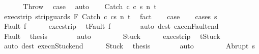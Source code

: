 \begin{isabellebody}
\isanewline
\ \ \isamarkupfalse%
\isanewline
{}\isamarkupfalse%
\isanewline
\ \ \isamarkupfalse%
\ Throw\ \isamarkupfalse%
\ {\isacharquery}case\ \isamarkupfalse%
\ auto\isanewline
{}\isamarkupfalse%
\isanewline
\ \ \isamarkupfalse%
\ {\isacharparenleft}Catch\ c{}\ c{}\ s\ n\ t{\isacharparenright}\isanewline
\ \ \isamarkupfalse%
\ exec{\isacharunderscore}strip{\isacharcolon}\ {\isachardoublequoteopen}{\isasymGamma}{\isasymturnstile}{\isasymlangle}strip{\isacharunderscore}guards\ F\ {\isacharparenleft}Catch\ c{}\ c{}{\isacharparenright}{\isacharcomma}s{\isasymrangle}\ {\isacharequal}n{\isasymRightarrow}\ t{\isachardoublequoteclose}\ \isamarkupfalse%
\ fact\isanewline
\ \ \isamarkupfalse%
\ {\isacharquery}case\isanewline
\ \ \isamarkupfalse%
\ {\isacharparenleft}cases\ {\isachardoublequoteopen}s{\isachardoublequoteclose}{\isacharparenright}\isanewline
\ \ \ \ \isamarkupfalse%
\ {\isacharparenleft}Fault\ f{\isacharparenright}\isanewline
\ \ \ \ \isamarkupfalse%
\ exec{\isacharunderscore}strip\ \isamarkupfalse%
\ {\isachardoublequoteopen}t{\isacharequal}Fault\ f{\isachardoublequoteclose}\isanewline
\ \ \ \ \ \ \isamarkupfalse%
\ {\isacharparenleft}auto\ dest{\isacharcolon}\ execn{\isacharunderscore}Fault{\isacharunderscore}end{\isacharparenright}\isanewline
\ \ \ \ \isamarkupfalse%
\ Fault\ \isamarkupfalse%
\ {\isacharquery}thesis\isanewline
\ \ \ \ \ \ \isamarkupfalse%
\ auto\isanewline
\ \ \isamarkupfalse%
\isanewline
\ \ \ \ \isamarkupfalse%
\ Stuck\isanewline
\ \ \ \ \isamarkupfalse%
\ exec{\isacharunderscore}strip\ \isamarkupfalse%
\ {\isachardoublequoteopen}t{\isacharequal}Stuck{\isachardoublequoteclose}\isanewline
\ \ \ \ \ \ \isamarkupfalse%
\ {\isacharparenleft}auto\ dest{\isacharcolon}\ execn{\isacharunderscore}Stuck{\isacharunderscore}end{\isacharparenright}\isanewline
\ \ \ \ \isamarkupfalse%
\ Stuck\ \isamarkupfalse%
\ {\isacharquery}thesis\isanewline
\ \ \ \ \ \ \isamarkupfalse%
\ auto\isanewline
\ \ \isamarkupfalse%
\isanewline
\ \ \ \ \isamarkupfalse%
\ {\isacharparenleft}Abrupt\ s{\isacharprime}{\isacharparenright}\isanewline
\ \ \ \ \isamarkupfalse%

\end{isabellebody}
